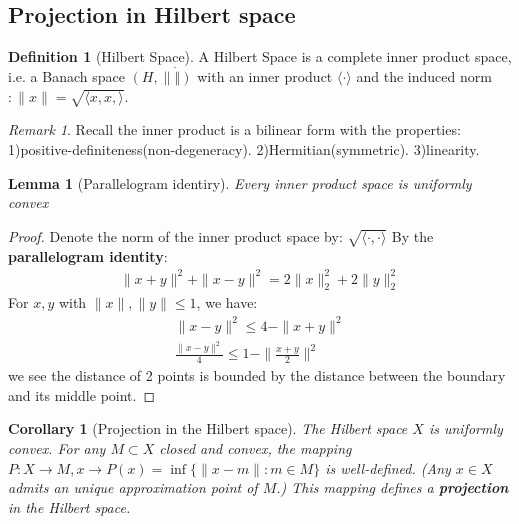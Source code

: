 \documentclass[a4paper,11pt,fleqn]{book}
\newtheorem{corollary}{Corollary}[theorem]
\newtheorem{lemma}[theorem]{Lemma}
\theoremstyle{definition}
\newtheorem{definition}{Definition}[section]
\theoremstyle{remark}
\newtheorem*{remark}{Remark}
\begin{document}
\subsection{Projection in Hilbert space}
\begin{definition}[Hilbert Space]
	A Hilbert Space is a complete inner product space, i.e. a Banach space $(H, \|\dot\|)$ with an inner product $\langle \cdot \rangle$ and the induced norm $:\|x\| = \sqrt{\langle x, x, \rangle}$. 
\end{definition}
\begin{remark}
Recall the inner product is a bilinear form with the properties: 1)positive-definiteness(non-degeneracy). 2)Hermitian(symmetric).  3)linearity.	
\end{remark}

\begin{lemma}[Parallelogram identiry]
	Every inner product space is uniformly convex
\end{lemma}
\begin{proof}
	Denote the norm of the inner product space by: $\sqrt{\langle \cdot , \cdot \rangle}$
	By the \textbf{parallelogram identity}:
	\begin{align*}
		\|x + y\|^2 + \|x - y\|^2 =  2\|x\|_2^2 + 2\|y\|_2^2 
	\end{align*}
	For $x, y$ with $\|x\|, \|y\| \leq 1$, we have:
	\begin{align*}
		\|x - y\|^2 \leq 4 - \|x+y\|^2\\
		\frac{\|x -y\|^2}{4} \leq 1 - \|\frac{x + y}{2}\|^2
	\end{align*}
	we see the distance of 2 points is bounded by the distance between the boundary and its middle point. 
\end{proof}

\begin{corollary}[Projection in the Hilbert space]
	The Hilbert space $X$ is uniformly convex. For any $M \subset X$ closed and convex, the mapping $P:X \rightarrow M, x \rightarrow  P(x) = \inf\{ \| x - m \|: m \in M \}$ is well-defined. (Any $x \in X$ admits an unique approximation point of $M$.) This mapping defines a \textbf{projection} in the Hilbert space. 
\end{corollary}
\end{document}
